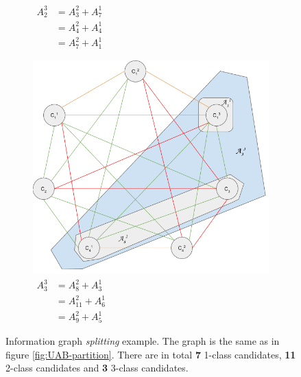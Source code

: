 \begin{figure}[h]
\begin{subfigure}[b]{\sfwidth}
    \caption[caption]{$\begin{aligned}
              A_2^3 &= A_3^2 + A_7^1\\
                    &= A_4^2 + A_4^1\\
                    &= A_7^2 + A_1^1
              \end{aligned}$}
  \end{subfigure}
  \begin{subfigure}[b]{\sfwidth}
    \includegraphics[width=\textwidth]{img/split-3-class_3.png}
    \caption[caption]{$\begin{aligned}
              A_3^3 &= A_8^2    + A_3^1\\
                    &= A_{11}^2 + A_6^1\\
                    &= A_9^2    + A_5^1
              \end{aligned}$}
  \end{subfigure}

  \caption{Information graph \emph{splitting} example. The graph is the same
           as in figure \ref{fig:UAB-partition}.
           There are in total \textbf{7}  1-class candidates,
                                    \textbf{11} 2-class candidates and
                                    \textbf{3}  3-class candidates.}
\end{figure}



